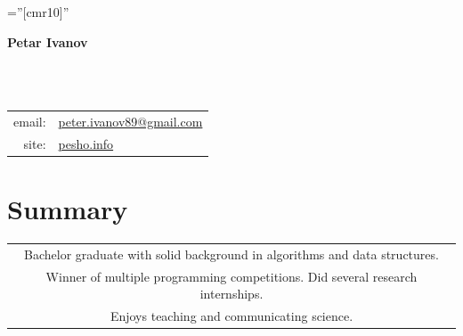 \documentclass[a4paper,10pt]{article}
\def\name{Petar Ivanov}
\newcommand{\minorcolor}[1]{\textcolor{mygray}{#1}}
\begin{document}
\pagestyle{empty}				%
\font\fb=''[cmr10]''				%

\begin{figure}
	\setlength\fboxsep{0pt}
	\setlength\fboxrule{0.1pt}
        \vspace{-50pt}
\end{figure}


\par{\raggedright\Huge\textbf{\vspace{-3mm}\hspace{0mm}\name}}\\		%
\vspace{-5mm}{\color{linegray}\rule{10.5cm}{0.1mm}}\\

\hspace{4mm}\begin{tabular}{rl}
	\minorcolor{email:} & \href{mailto:peter.ivanov89@gmail.com}{peter.ivanov89@gmail.com}\\
	\minorcolor{site:} & \href{http://pesho.info}{pesho.info}\\
\end{tabular}
\bigskip


\section{Summary}
\begin{center}
  \begin{tabular}{c}
      Bachelor graduate with solid background in algorithms and data structures.\\
      Winner of multiple programming competitions. Did several research internships.\\
      Enjoys teaching and communicating science.\\
    \end{tabular}
\end{center}
\end{document}
